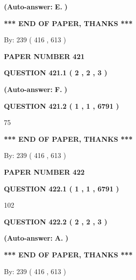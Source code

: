 \documentclass{ctexart}
\begin{document}
 
{\textbf{(Auto-answer:}}
{\textbf{\large{
E.}}}
{\textbf{)}}
 
 
   
   
   
   
\vspace{1.0in} 
{\textbf{\large{ *** END OF PAPER, THANKS *** }}} 
   
   
\hspace{1.0in} By: 
 239 ( 416 ,  613 )
   
   
   
   
\newpage 
\setcounter{page}{ 
   421001 } 
   
   
 {\textbf{ \Large{ PAPER NUMBER  421  }}}
   
   
   
   
  
  
{\textbf{\large{QUESTION
421.1 
 ( 2 , 2 , 3 )
}}}
 
 
{\textbf{(Auto-answer:}}
{\textbf{\large{
F.}}}
{\textbf{)}}
 
 
  
  
{\textbf{\large{QUESTION
421.2 
 ( 1 , 1 , 6791 )
}}}

75
   
   
   
   
\vspace{1.0in} 
{\textbf{\large{ *** END OF PAPER, THANKS *** }}} 
   
   
\hspace{1.0in} By: 
 239 ( 416 ,  613 )
   
   
   
   
\newpage 
\setcounter{page}{ 
   422001 } 
   
   
 {\textbf{ \Large{ PAPER NUMBER  422  }}}
   
   
   
   
  
  
{\textbf{\large{QUESTION
422.1 
 ( 1 , 1 , 6791 )
}}}

102
  
  
{\textbf{\large{QUESTION
422.2 
 ( 2 , 2 , 3 )
}}}
 
 
{\textbf{(Auto-answer:}}
{\textbf{\large{
A.}}}
{\textbf{)}}
 
 
   
   
   
   
\vspace{1.0in} 
{\textbf{\large{ *** END OF PAPER, THANKS *** }}} 
   
   
\hspace{1.0in} By: 
 239 ( 416 ,  613 )
   
   
   
\end{document}
